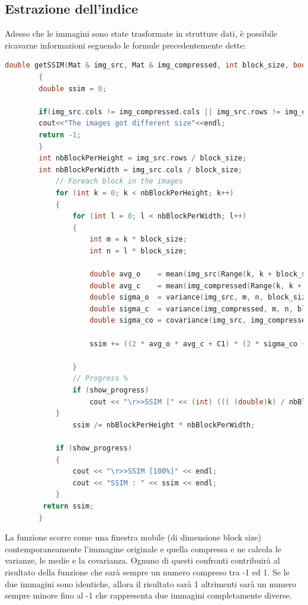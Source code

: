 \documentclass[a4paper,11pt]{article}
\begin{document}
    \subsection{Estrazione dell'indice}
    Adesso che le immagini sono state trasformate in strutture dati, è possibile ricavarne informazioni seguendo le formule precedentemente dette:
    \begin{lstlisting}[language=C++]
        double getSSIM(Mat & img_src, Mat & img_compressed, int block_size, bool show_progress = true)
        {
        double ssim = 0;

        if(img_src.cols != img_compressed.cols || img_src.rows != img_compressed.rows){
        cout<<"The images got different size"<<endl;
        return -1;
        }
        int nbBlockPerHeight = img_src.rows / block_size;
        int nbBlockPerWidth = img_src.cols / block_size;
            // Foreach block in the images
            for (int k = 0; k < nbBlockPerHeight; k++)
            {
                for (int l = 0; l < nbBlockPerWidth; l++)
                {
                    int m = k * block_size;
                    int n = l * block_size;

                    double avg_o 	= mean(img_src(Range(k, k + block_size), Range(l, l + block_size)))[0];
                    double avg_c 	= mean(img_compressed(Range(k, k + block_size), Range(l, l + block_size)))[0];
                    double sigma_o 	= variance(img_src, m, n, block_size);
                    double sigma_c 	= variance(img_compressed, m, n, block_size);
                    double sigma_co	= covariance(img_src, img_compressed, m, n, block_size);

                    ssim += ((2 * avg_o * avg_c + C1) * (2 * sigma_co + C2)) / ((avg_o * avg_o + avg_c * avg_c + C1) * (sigma_o * sigma_o + sigma_c * sigma_c + C2));
                    
                }
                // Progress %
                if (show_progress)
                    cout << "\r>>SSIM [" << (int) ((( (double)k) / nbBlockPerHeight) * 100) << "%]";
            }
                ssim /= nbBlockPerHeight * nbBlockPerWidth;

            if (show_progress)
            {
                cout << "\r>>SSIM [100%]" << endl;
                cout << "SSIM : " << ssim << endl;
            }
         return ssim;
        }
    \end{lstlisting}
    La funzione scorre come una finestra mobile (di dimensione block size) contemporaneamente l'immagine originale e quella compressa e ne calcola le varianze, le medie e la covarianza. 
    Ognuno di questi confronti contribuirà al risultato della funzione che sarà sempre un numero compreso tra -1 ed 1.
    Se le due immagini sono identiche, allora il risultato sarà 1 altrimenti sarà un numero sempre minore fino al -1 che rappresenta due immagini completamente diverse.
\end{document}
